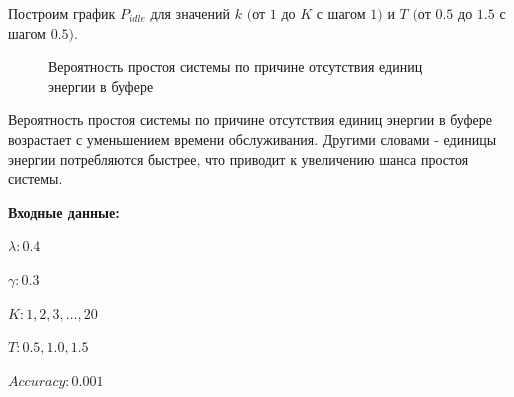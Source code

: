\documentclass[12pt, a4paper]{article}
\begin{document}
Построим график $P_{idle}$ для значений $k$ $($от $1$ до $K$ с шагом $1)$ и  $T$ $($от $0.5$ до $1.5$  с шагом $0.5)$.
\begin{figure}[h]
	\caption{Вероятность простоя системы по причине отсутствия единиц энергии в буфере}
	\label{ris6}
\end{figure}

Вероятность простоя системы по причине отсутствия единиц энергии в буфере возрастает с уменьшением времени обслуживания. Другими словами - единицы энергии потребляются быстрее, что приводит к увеличению шанса простоя системы.

\pagebreak
\textbf{Входные данные:}

$\lambda: 0.4$

$\gamma: 0.3$

$K: 1, 2, 3, \ldots, 20$

$T: 0.5, 1.0, 1.5$

$Accuracy: 0.001$
\end{document}

